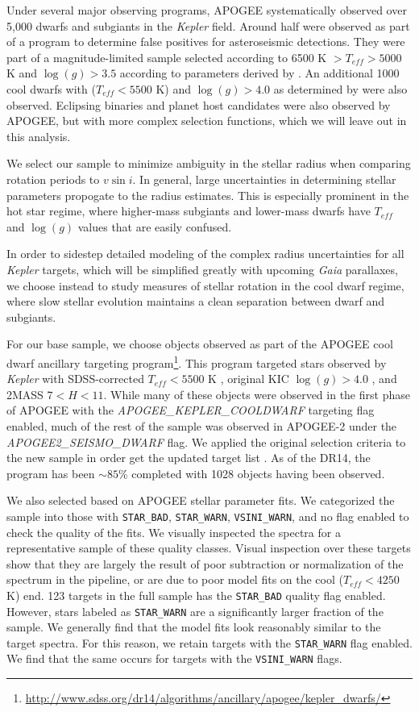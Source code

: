 \documentclass[manuscript]{aastex6}
\newcommand{\vsini}{\ensuremath{v \sin i}}
\newcommand{\Kepler}{\mbox{\textit{Kepler}}}
\newcommand{\Gaia}{\mbox{\textit{Gaia}}}
\newcommand{\Teff}{\ensuremath{T_{eff}}}
\newcommand{\logg}{\ensuremath{\log(g)}}
\newcommand{\STARBAD}{\texttt{STAR\_BAD}}
\newcommand{\STARWARN}{\texttt{STAR\_WARN}}
\newcommand{\VSINIWARN}{\texttt{VSINI\_WARN}}
\newcommand{\gvs}{\authorcomment1}
\begin{document}
Under several major observing programs, APOGEE systematically observed over 
5,000 dwarfs and subgiants in the \Kepler{} field. Around half were
observed as part of a program to determine false positives for
asteroseismic detections. They were part of a magnitude-limited sample
selected according to 6500 K \(> \Teff > 5000\) K and \(\logg > 3.5\)
according to parameters derived by \citet{Huber14}. An additional 1000
cool dwarfs with (\(\Teff < 5500\) K) and \(\logg > 4.0\) as determined
by \citet{Brown11,Pinsonneault12} were also observed. Eclipsing binaries
and planet host candidates were also observed by APOGEE, but with more
complex selection functions, which we will leave out in this analysis.

We select our sample to minimize ambiguity in the stellar radius when
comparing rotation periods to \vsini. In general, large uncertainties in
determining stellar parameters propogate to the radius estimates. This is 
especially prominent in the hot star regime, where higher-mass subgiants and 
lower-mass dwarfs have \Teff{} and \logg{} values that are easily confused.

In order to sidestep detailed modeling of the complex radius uncertainties 
for all \Kepler{} targets, which will be simplified greatly with upcoming
\Gaia{} parallaxes, we choose instead to study measures of
stellar rotation in the cool  dwarf regime, where
slow stellar evolution maintains a clean separation between dwarf and
subgiants. 

For our base sample, we choose objects observed as part of the APOGEE cool
dwarf ancillary targeting
program\footnote{\url{http://www.sdss.org/dr14/algorithms/ancillary/apogee/kepler_dwarfs/}}.
This program targeted stars observed by \Kepler{} with SDSS-corrected
\(\Teff < 5500\) K \citep{Pinsonneault12}, original KIC \(\logg > 4.0\)
\citep{Brown11}, and 2MASS \(7 < H < 11\). While many of these objects
were observed in the first phase of APOGEE with the
\textit{APOGEE\_KEPLER\_COOLDWARF} targeting flag enabled, much of the rest of
the sample was observed in APOGEE-2 under the \textit{APOGEE2\_SEISMO\_DWARF}
flag. We applied the original selection criteria to the new sample in order get
the updated target list \gvs{Use Jen's original list for this?}. As of the DR14, 
the program has been \(\sim 85\)\% completed with 1028 objects having been 
observed. 

We also selected based on APOGEE stellar parameter fits. We categorized the 
sample into those with \STARBAD, \STARWARN,
\VSINIWARN{}, and no flag enabled to check the quality of the fits. We
visually inspected the spectra for a representative sample of these
quality classes. 
Visual inspection over these targets show that they are largely
the result of poor subtraction or normalization of the spectrum in the
pipeline, or are due to poor model fits on the cool (\(\Teff < 4250\) K) end. 123
targets in the full sample has the \STARBAD{} quality flag enabled. 
However, stars labeled as \STARWARN{} are a significantly larger fraction of the 
sample. We generally find that the model fits look reasonably similar to the 
target spectra. For this reason, we retain targets
with the \STARWARN{} flag enabled. We find that the same occurs for targets with 
the \VSINIWARN{} flags.
\end{document}
